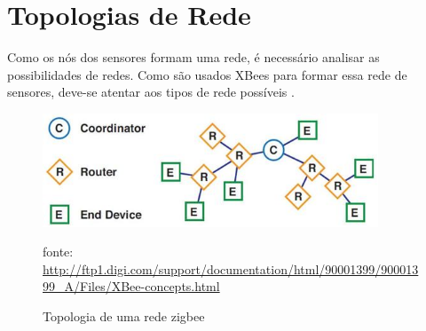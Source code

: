  
\section{Topologias de Rede}
\label{Sec:Redes_topologias}
 Como os nós dos sensores formam uma rede, é necessário analisar as possibilidades de redes.  Como são usados XBees para formar essa rede de sensores, deve-se atentar aos tipos de rede possíveis \cite{xbee_book} \cite{xbee_documentation}.
 
\begin{figure}[H]
\centering
\includegraphics[width=10cm,keepaspectratio]{figuras/zigbee_network_topology.jpg}
\caption{\label{fig:zigbee_network} Topologia de uma rede zigbee}
fonte: \url{http://ftp1.digi.com/support/documentation/html/90001399/90001399_A/Files/XBee-concepts.html}
\end{figure}
 
